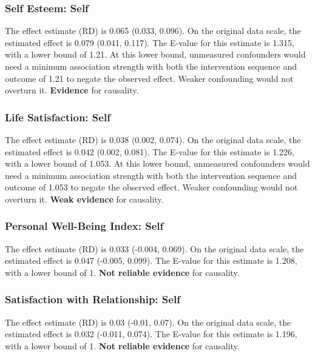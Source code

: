\documentclass[
  singlecolumn]{article}
\begin{document}
\subsubsection{Self Esteem: Self}\label{self-esteem-self-3}

The effect estimate (RD) is 0.065 (0.033, 0.096). On the original data
scale, the estimated effect is 0.079 (0.041, 0.117). The E-value for
this estimate is 1.315, with a lower bound of 1.21. At this lower bound,
unmeasured confounders would need a minimum association strength with
both the intervention sequence and outcome of 1.21 to negate the
observed effect. Weaker confounding would not overturn it.
\textbf{Evidence} for causality.

\subsubsection{Life Satisfaction: Self}\label{life-satisfaction-self-3}

The effect estimate (RD) is 0.038 (0.002, 0.074). On the original data
scale, the estimated effect is 0.042 (0.002, 0.081). The E-value for
this estimate is 1.226, with a lower bound of 1.053. At this lower
bound, unmeasured confounders would need a minimum association strength
with both the intervention sequence and outcome of 1.053 to negate the
observed effect. Weaker confounding would not overturn it. \textbf{Weak
evidence} for causality.

\subsubsection{Personal Well-Being Index:
Self}\label{personal-well-being-index-self-3}

The effect estimate (RD) is 0.033 (-0.004, 0.069). On the original data
scale, the estimated effect is 0.047 (-0.005, 0.099). The E-value for
this estimate is 1.208, with a lower bound of 1. \textbf{Not reliable
evidence} for causality.

\subsubsection{Satisfaction with Relationship:
Self}\label{satisfaction-with-relationship-self-3}

The effect estimate (RD) is 0.03 (-0.01, 0.07). On the original data
scale, the estimated effect is 0.032 (-0.011, 0.074). The E-value for
this estimate is 1.196, with a lower bound of 1. \textbf{Not reliable
evidence} for causality.
\end{document}

